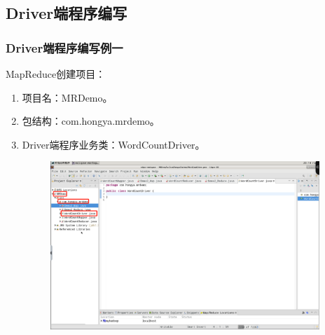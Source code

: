 \documentclass {article}
\begin{document}
		\subsection{Driver端程序编写}
			\subsubsection{Driver端程序编写例一}
				MapReduce创建项目：
				\begin{enumerate}
					\item 项目名：MRDemo。
					\item 包结构：com.hongya.mrdemo。
					\item Driver端程序业务类：WordCountDriver。
					\begin{figure}[H]
						\centering
						\includegraphics[width=4in]{figures/fig7.png}
					\end{figure}
				\end{enumerate}
			
\end{document}
